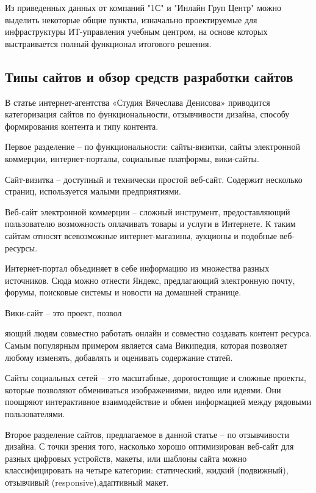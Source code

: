 Из приведенных данных от компаний "1С" и "Инлайн Груп Центр" можно выделить некоторые общие пункты, изначально проектируемые для инфраструктуры ИТ-управления учебным центром, на основе которых выстраивается полный функционал итогового решения.

\subsection{Типы сайтов и обзор средств разработки сайтов}

В статье \cite{denisov} интернет-агентства «Студия Вячеслава Денисова» приводится категоризация сайтов по функциональности, отзывчивости дизайна, способу формирования контента и типу контента.


Первое разделение -- по функциональности: сайты-визитки, сайты электронной коммерции, интернет-порталы, социальные платформы, вики-сайты.

Сайт-визитка -- доступный и технически простой веб-сайт.
Содержит несколько страниц, используется малыми предприятиями.

Веб-сайт электронной коммерции -- сложный инструмент, предоставляющий пользователю возможность оплачивать товары и услуги в Интернете.
К таким сайтам относят всевозможные интернет-магазины, аукционы и подобные веб-ресурсы.

Интернет-портал объединяет в себе информацию из множества разных источников.
Сюда можно отнести Яндекс, предлагающий электронную почту, форумы, поисковые системы и новости на домашней странице.

Вики-сайт -- это проект, позвол


яющий людям совместно работать онлайн и совместно создавать контент ресурса.
Самым популярным примером является сама Википедия, которая позволяет любому изменять, добавлять и оценивать содержание статей.

Сайты социальных сетей -- это масштабные, дорогостоящие и сложные проекты, которые позволяют обмениваться изображениями, видео или идеями.
Они поощряют интерактивное взаимодействие и обмен информацией между рядовыми пользователями.


Второе разделение сайтов, предлагаемое в данной статье \cite{denisov} -- по отзывчивости дизайна.
С точки зрения того, насколько хорошо оптимизирован веб-сайт для разных цифровых устройств, макеты, или шаблоны сайта можно классифицировать на четыре категории: статический, жидкий (подвижный), отзывчивый (responsive),адаптивный макет.

